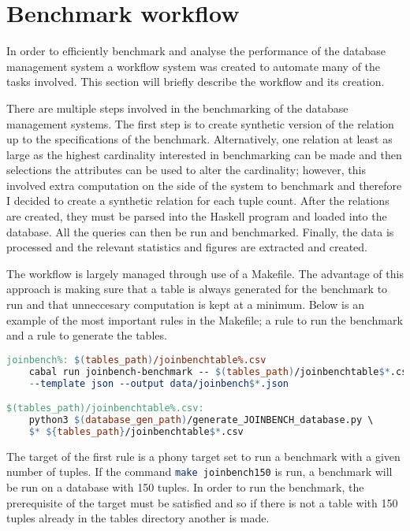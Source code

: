 \section{Benchmark workflow}\label{sec:benchmark:workflow}
In order to efficiently benchmark and analyse the performance of the database
management system a workflow system was created to automate many of the tasks
involved. This section will briefly describe the workflow and its creation.

There are multiple steps involved in the benchmarking of the database management
systems. The first step is to create synthetic version of the
 relation up to the specifications of the benchmark.
Alternatively, one relation at least as large as the highest cardinality
interested in benchmarking can be made and then selections the
 attributes can be used to alter the cardinality;
however, this involved extra computation on the side of the system to benchmark
and therefore I decided to create a synthetic relation for each tuple count.
After the relations are created, they must be parsed into the Haskell program
and loaded into the database. All the queries can then be run and benchmarked.
Finally, the data is processed and the relevant statistics and figures are
extracted and created.

The workflow is largely managed through use of a Makefile. The advantage of this
approach is making sure that a table is always generated for the benchmark to
run and that unneccesary computation is kept at a minimum. Below is an example
of the most important rules in the Makefile; a rule to run the benchmark and a
rule to generate the tables.

\begin{lstlisting}[language=make]
joinbench%: $(tables_path)/joinbenchtable%.csv
	cabal run joinbench-benchmark -- $(tables_path)/joinbenchtable$*.csv \ 
    --template json --output data/joinbench$*.json

$(tables_path)/joinbenchtable%.csv:
	python3 $(database_gen_path)/generate_JOINBENCH_database.py \
    $* ${tables_path}/joinbenchtable$*.csv
\end{lstlisting}

The target of the first rule is a phony target set to run a benchmark with a
given number of tuples. If the command \lstinline[language=bash]{make
joinbench150} is run, a benchmark will be run on a database with 150 tuples. In
order to run the benchmark, the prerequisite of the target must be satisfied and
so if there is not a table with 150 tuples already in the tables directory
another is made.

